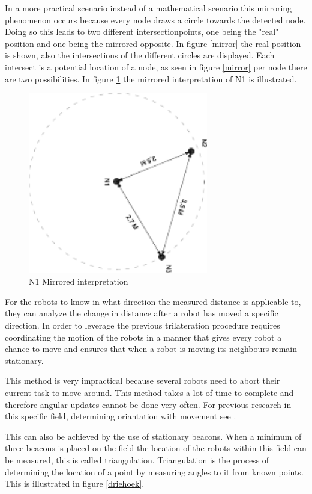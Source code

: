 \documentclass[10pt,a4paper]{article}
\begin{document}
In a more practical scenario instead of a mathematical scenario this mirroring phenomenon occurs because every node draws a circle towards the detected node. Doing so this leads to two different intersectionpoints, one being the "real" position and one being the mirrored opposite. In figure \ref{mirror} the real position is shown, also the intersections of the different circles are displayed. Each intersect is a potential location of a node, as seen in figure \ref{mirror} per node there are two possibilities. In figure \ref{mirror1} the mirrored interpretation of N1 is illustrated.
 
\begin{figure}[H]
\centering
\includegraphics[angle=90,width=0.7\textwidth]{Mirror.pdf}
\caption{N1 Mirrored interpretation}
\label{mirror1}
\end{figure}

For the robots to know in what direction the measured distance is applicable to, they can analyze the change in distance after a robot has moved a specific direction. In order to leverage the previous trilateration procedure requires coordinating the motion of the robots in a manner that gives every robot a chance to move and ensures that when a robot is moving its neighbours remain stationary. \cite{Angle}

This method is very impractical because several robots need to abort their current task to move around. This method takes a lot of time to complete and therefore angular updates cannot be done very often. For previous research in this specific field, determining oriantation with movement see \cite{delft}.

This can also be achieved by the use of stationary beacons. When a minimum of three beacons is placed on the field the location of the robots within this field can be measured, this is called triangulation. Triangulation is the process of determining the location of a point by measuring angles to it from known points. This is illustrated in figure \ref{driehoek}.
\end{document}
